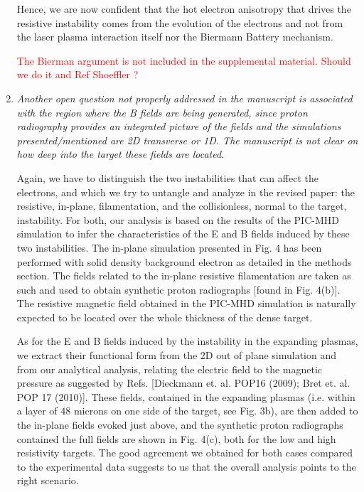 \documentclass[aps,showpacs,superscriptaddress]{revtex4}%
\begin{document}
\begin{enumerate}
Hence, we are now confident that the hot electron anisotropy that drives the resistive instability  comes from the evolution of the electrons and not from the laser plasma interaction itself nor the Biermann Battery mechanism. 

\textcolor{red}{ The Bierman argument is not included in the supplemental material.  Should we do it and  Ref Shoeffler ?  }

\item \textit{ Another open question not properly addressed in the manuscript is associated with the region where the B fields are being generated, since proton radiography provides an integrated picture of the fields and the simulations presented/mentioned are 2D transverse or 1D. The manuscript is not clear on how deep into the target these fields are located. }

Again, we have to distinguish the two instabilities that can affect the electrons, and which we try to untangle and analyze in the revised paper: the resistive, in-plane, filamentation, and the collisionless, normal to the target, instability. 
For both,  our analysis is based on the results of the PIC-MHD simulation to infer the characteristics of the E and B fields induced by these two instabilities. The in-plane simulation presented in Fig. 4 has been performed with solid density background   electron as detailed in the methods section. The fields related to the in-plane resistive filamentation are taken as such and used to obtain synthetic proton radiographs [found in Fig. 4(b)]. The resistive magnetic field   obtained in the PIC-MHD simulation is naturally expected to be located over the whole thickness of the dense target.  

As for the E and  B fields induced by the instability in the expanding plasmas, we extract their functional form from the 2D out of plane simulation and from our analytical analysis, relating the electric field to the magnetic pressure as suggested by Refs. [Dieckmann et. al. POP16 (2009); Bret et. al. POP 17 (2010)]. These fields, contained in the expanding plasmas (i.e. within a layer of $48$ microns on one side of the target, see Fig. 3b), are then added to the in-plane fields evoked just above, and the synthetic proton radiographs contained the full fields are shown in Fig. 4(c), both for the low and high resistivity targets. The good agreement we obtained for both cases compared to the experimental data suggests to us that the overall analysis points to the right scenario.


\end{enumerate}
\end{document}
